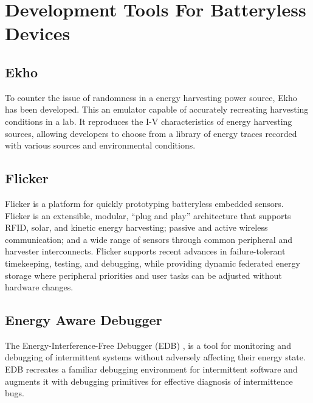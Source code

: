 \section{Development Tools For Batteryless Devices}


\subsection{Ekho}

To counter the issue of randomness in a energy harvesting power source, Ekho \cite{ekho} has been developed. This an emulator capable of accurately recreating harvesting conditions in a lab. It reproduces the I-V characteristics of energy harvesting sources, allowing developers to choose from a library of energy traces recorded with various sources and environmental conditions.

\subsection{Flicker}
Flicker \cite{flicker} is a platform for quickly prototyping batteryless embedded sensors. Flicker is an extensible, modular, “plug and play” architecture that supports RFID, solar, and kinetic energy harvesting; passive and active wireless communication; and a wide range of sensors through common peripheral and harvester interconnects. Flicker supports recent advances in failure-tolerant timekeeping, testing, and debugging, while providing dynamic federated energy storage where peripheral priorities and user tasks can be adjusted without hardware changes.

\subsection{Energy Aware Debugger}
The Energy-Interference-Free Debugger (EDB) \cite{edb}, is a tool for monitoring and debugging of intermittent systems without adversely affecting their energy state. EDB recreates a familiar debugging environment for intermittent software and augments it with debugging primitives for effective diagnosis of intermittence bugs.



